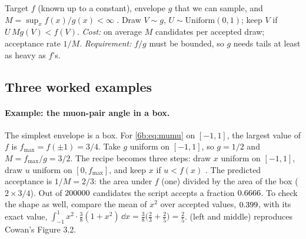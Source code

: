 \begin{workdef}
Target $f$ (known up to a constant), envelope $g$ that we can sample, and
$M=\sup_x f(x)/g(x)<\infty$ .
Draw $V\sim g$, $U\sim\mathrm{Uniform}(0,1)$; keep $V$ if $U\,Mg(V)<f(V)$.
\emph{Cost:} on average $M$ candidates per accepted draw; acceptance rate $1/M$.
\emph{Requirement:} $f/g$ must be bounded, so $g$ needs tails at least as heavy as
$f$'s.
\end{workdef}

\subsection{Three worked examples}
\label{6b:sec:reject-examples}

\paragraph{Example: the muon-pair angle in a box.}
The simplest envelope is a box. For \eqref{6b:eq:mumu} on $[-1,1]$, the largest value of
$f$ is $f_{\max}=f(\pm1)=3/4$. Take $g$ uniform on $[-1,1]$, so $g=1/2$ and
$M=f_{\max}/g=3/2$. The recipe becomes three steps: draw $x$ uniform on $[-1,1]$,
draw $u$ uniform on $[0,f_{\max}]$, and keep $x$ if $u<f(x)$ .
The predicted acceptance is $1/M=2/3$: the area under $f$ (one) divided by the
area of the box ($2\times3/4$). Out of $200000$ candidates the script accepts a
fraction $0.6666$. To check the shape as well, compare the mean of $x^2$ over
accepted values, $0.399$, with its exact value,
$\int_{-1}^1x^2\cdot\frac38(1+x^2)\,\dd x=\frac38\bigl(\frac23+\frac25\bigr)=\frac25$.
 (left and middle) reproduces Cowan's Figure 3.2.


